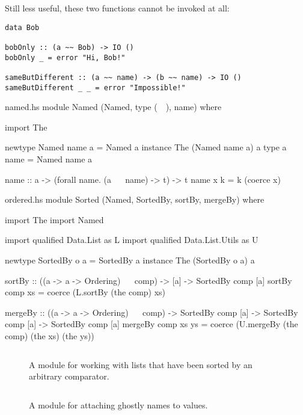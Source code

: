 \documentclass[format=sigplan, review=false, screen=true]{acmart}
\begin{document}
Still less useful, these two functions cannot be invoked at all:
\begin{verbatim}
data Bob

bobOnly :: (a ~~ Bob) -> IO ()
bobOnly _ = error "Hi, Bob!"

sameButDifferent :: (a ~~ name) -> (b ~~ name) -> IO ()
sameButDifferent _ _ = error "Impossible!"
\end{verbatim}
\begin{filecontents*}{named.hs}
module Named (Named, type (~~), name) where

import The

newtype Named name a = Named a
instance The (Named name a) a
type a ~~ name = Named name a

name :: a -> (forall name. (a ~~ name) -> t) -> t
name x k = k (coerce x)
\end{filecontents*}

\begin{filecontents*}{ordered.hs}
module Sorted
  (Named, SortedBy, sortBy, mergeBy) where   

import The
import Named

import qualified Data.List as L
import qualified Data.List.Utils as U

newtype SortedBy o a = SortedBy a
instance The (SortedBy o a) a
  
sortBy :: ((a -> a -> Ordering) ~~ comp)
       -> [a]
       -> SortedBy comp [a]
sortBy comp xs = coerce (L.sortBy (the comp) xs)

mergeBy :: ((a -> a -> Ordering) ~~ comp)
        -> SortedBy comp [a]
        -> SortedBy comp [a]
        -> SortedBy comp [a]
mergeBy comp xs ys =
  coerce (U.mergeBy (the comp) (the xs) (the ys))        
\end{filecontents*}


\begin{figure}
  \inputminted{haskell}{ordered.hs}
  \caption{A module for working with lists that have been sorted by an arbitrary
    comparator.}
\end{figure}


\begin{figure}
  \inputminted{haskell}{named.hs}
  \caption{A module for attaching ghostly names to values.\label{name-module}}
\end{figure}
\end{document}
